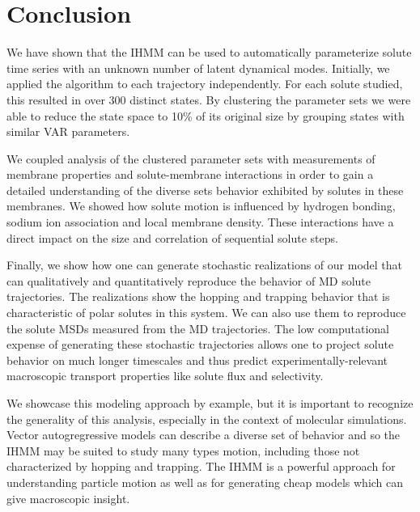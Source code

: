 \documentclass{article}
\begin{document}
  
  \section{Conclusion}
  
  We have shown that the IHMM can be used to automatically parameterize solute 
  time series with an unknown number of latent dynamical modes. Initially, we applied
  the algorithm to each trajectory independently. For each solute studied, this resulted
  in over 300 distinct states. By clustering the parameter sets we were able to reduce 
  the state space to 10\% of its original size by grouping states with similar VAR
  parameters.
  
  We coupled analysis of the clustered parameter sets with measurements of membrane 
  properties and solute-membrane interactions in order to gain a detailed understanding
  of the diverse sets behavior exhibited by solutes in these membranes. We showed how
  solute motion is influenced by hydrogen bonding, sodium ion association and local
  membrane density. These interactions have a direct impact on the size and
  correlation of sequential solute steps.
  
  Finally, we show how one can generate stochastic realizations of our model that
  can qualitatively and quantitatively reproduce the behavior of MD solute 
  trajectories. The realizations show the hopping and trapping behavior that is
  characteristic of polar solutes in this system. We can also use them to reproduce
  the solute MSDs measured from the MD trajectories. The low computational expense 
  of generating these stochastic trajectories allows one to project solute behavior
  on much longer timescales and thus predict experimentally-relevant macroscopic 
  transport properties like solute flux and selectivity.
  
  We showcase this modeling approach by example, but it is important to
  recognize the generality of this analysis, especially in the context of molecular
  simulations. Vector autogregressive models can describe a diverse set of behavior
  and so the IHMM may be suited to study many types motion, including those not 
  characterized by hopping and trapping. The IHMM is a powerful approach for 
  understanding particle motion as well as for generating cheap models
  which can give macroscopic insight.
  
\end{document}
